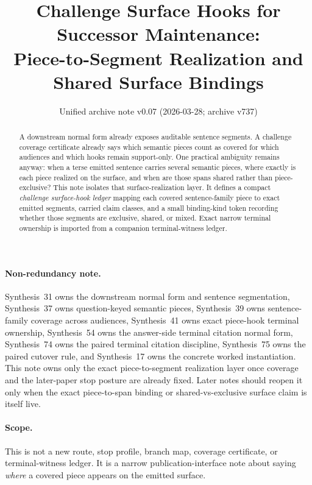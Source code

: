 \documentclass[11pt]{article}
\title{Challenge Surface Hooks for Successor Maintenance:\\[0.5ex]
\large Piece-to-Segment Realization and Shared Surface Bindings}
\author{}
\date{Unified archive note v0.07 (2026-03-28; archive v737)}
\begin{document}
\maketitle

\begin{abstract}
A downstream normal form already exposes auditable sentence segments.
A challenge coverage certificate already says which semantic pieces count as covered for which audiences and which hooks remain support-only.
One practical ambiguity remains anyway: when a terse emitted sentence carries several semantic pieces, where exactly is each piece realized on the surface, and when are those spans shared rather than piece-exclusive?
This note isolates that surface-realization layer.
It defines a compact \emph{challenge surface-hook ledger} mapping each covered sentence-family piece to exact emitted segments, carried claim classes, and a small binding-kind token recording whether those segments are exclusive, shared, or mixed.
Exact narrow terminal ownership is imported from a companion terminal-witness ledger.
\end{abstract}

\paragraph{Non-redundancy note.}
Synthesis~31 owns the downstream normal form and sentence segmentation, Synthesis~37 owns question-keyed semantic pieces, Synthesis~39 owns sentence-family coverage across audiences, Synthesis~41 owns exact piece-hook terminal ownership, Synthesis~54 owns the answer-side terminal citation normal form, Synthesis~74 owns the paired terminal citation discipline, Synthesis~75 owns the paired cutover rule, and Synthesis~17 owns the concrete worked instantiation.
This note owns only the exact piece-to-segment realization layer once coverage and the later-paper stop posture are already fixed. Later notes should reopen it only when the exact piece-to-span binding or shared-vs-exclusive surface claim is itself live.
\paragraph{Scope.}
This is not a new route, stop profile, branch map, coverage certificate, or terminal-witness ledger.
It is a narrow publication-interface note about saying \emph{where} a covered piece appears on the emitted surface.
\end{document}
